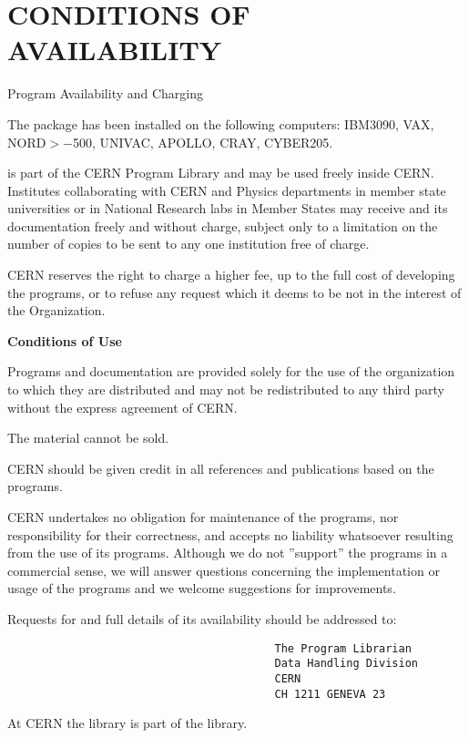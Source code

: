 \chapter{CONDITIONS OF AVAILABILITY}
Program Availability and Charging
\par The  package has been installed on the following computers:
IBM3090, VAX, NORD$>-$500, UNIVAC, APOLLO, CRAY, CYBER205.
\par {} is part of the CERN Program Library and may be used freely inside CERN.
Institutes collaborating with CERN and Physics departments in
member state universities or in National Research labs
in Member States may receive  and its
documentation freely and without charge, subject only to a limitation
on the number of copies to be sent to any one institution free of charge.
\par CERN reserves the right to charge a higher fee, up to the full
cost of developing the programs, or to refuse any request
which it deems to be not in the interest of the Organization.
\begin{center}{\bf Conditions of Use}\end{center}
\par Programs and documentation are provided solely for the use of
the organization to which they are distributed and may not be redistributed
to any third party without the express agreement of CERN.
\par The material cannot be sold.
\par CERN should be given credit in all references and publications
based on the programs.
\par CERN undertakes no obligation for maintenance of the programs,
nor responsibility for their correctness,
and accepts no liability whatsoever resulting from the use of its programs.
Although we do not ''support'' the programs in a commercial sense,
we will answer questions concerning the implementation or usage
of the programs and we welcome suggestions for improvements.
\par Requests for  and full details of its availability
should be addressed to:
\begin{verbatim}
                                         The Program Librarian
                                         Data Handling Division
                                         CERN
                                         CH 1211 GENEVA 23
\end{verbatim}
\par At CERN the  library is part of the
 library.
 

